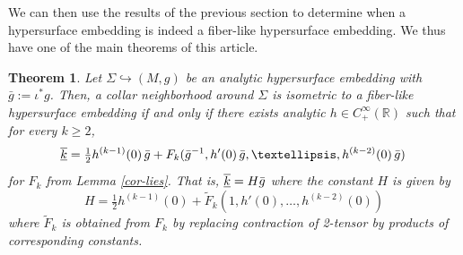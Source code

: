 \documentclass[a4paper,10.9pt]{amsart}
\newtheorem{theorem}{Theorem}[section]
\theoremstyle{definition}
\theoremstyle{remark}
\numberwithin{equation}{section}
\renewcommand{\=}{\stackrel \Sigma =}
\renewcommand\geq{\geqslant}
\newcommand{\FF}[1]{\underline{\overline{\rm{#1}}}}
\begin{document}
We can then use the results of the previous section to determine when a hypersurface embedding is indeed a fiber-like hypersurface embedding. We thus have one of the main theorems of this article.
\begin{theorem} \label{fiber-theorem}
Let $\Sigma \hookrightarrow (M,g)$ be an analytic hypersurface embedding with $\bar{g} := \iota^* g$. Then, a collar neighborhood around $\Sigma$ is isometric to a fiber-like hypersurface embedding if and only if there exists analytic $h \in C^\infty_+(\mathbb{R})$ such that for every $k \geq 2$,
$$\FF{k} = \tfrac{1}{2} h^{(k-1)}(0) \, \bar{g} + F_k(\bar{g}^{-1}, h'(0) \,\bar{g}, \ldots, h^{(k-2)}(0)\, \bar{g})\,$$
for $F_k$ from Lemma \ref{cor-lies}. That is, $\FF{k} = H\bar{g}$ where the constant $H$ is given by
$$ H = \tfrac{1}{2} h^{(k-1)}(0) + \widetilde{F}_k(1, h'(0), \ldots, h^{(k-2)}(0))  $$
where $\widetilde{F}_k$ is obtained from ${F}_k$ by replacing contraction of 2-tensor by products of corresponding constants.
\end{theorem}
\end{document}
